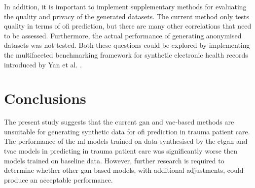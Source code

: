 \documentclass[12pt, a4paper]{article}
\begin{document}
In addition, it is important to implement supplementary methods for evaluating the quality and privacy of the generated
datasets. The current method only tests quality in terms of \acrshort{ofi} prediction, but there are many other
correlations that need to be assessed. Furthermore, the actual performance of generating anonymised datasets was not
tested. Both these questions could be explored by implementing the multifaceted benchmarking framework for synthetic
electronic health records introduced by Yan et al. \cite{yan_multifaceted_2022}.

\section{Conclusions}
The present study suggests that the current \acrshort{gan} and \acrshort{vae}-based methods are unsuitable for
generating synthetic data for \acrshort{ofi} prediction in trauma patient care. The performance of the \acrshort{ml}
models trained on data synthesised by the \acrshort{ctgan} and \acrshort{tvae} models in predicting  in
trauma patient care was significantly worse then models trained on baseline data. However, further research is required
to determine whether other \acrshort{gan}-based models, with additional adjustments, could produce an acceptable
performance.

\newpage

\singlespacing

\printbibliography

\newpage
\end{document}
